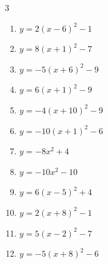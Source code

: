 \begin{multicols}{3}
\begin{enumerate}
  \item $\displaystyle y=2\left( x-6\right)^{2}-1$

        \phantom{$\displaystyle 頂点\left( 6 , -1 \right)$}

  \item $\displaystyle y=8\left( x+1\right)^{2}-7$

        \phantom{$\displaystyle 頂点\left( -1 , -7 \right)$}

  \item $\displaystyle y=-5\left( x+6\right)^{2}-9$

        \phantom{$\displaystyle 頂点\left( -6 , -9 \right)$}

  \item $\displaystyle y=6\left( x+1\right)^{2}-9$

        \phantom{$\displaystyle 頂点\left( -1 , -9 \right)$}

  \item $\displaystyle y=-4\left( x+10\right)^{2}-9$

        \phantom{$\displaystyle 頂点\left( -10 , -9 \right)$}

  \item $\displaystyle y=-10\left( x+1\right)^{2}-6$

        \phantom{$\displaystyle 頂点\left( -1 , -6 \right)$}

  \item $\displaystyle y=-8x^{2}+4$

        \phantom{$\displaystyle 頂点\left( 0 , 4 \right)$}

  \item $\displaystyle y=-10x^{2}-10$

        \phantom{$\displaystyle 頂点\left( 0 , -10 \right)$}

  \item $\displaystyle y=6\left( x-5\right)^{2}+4$

        \phantom{$\displaystyle 頂点\left( 5 , 4 \right)$}

  \item $\displaystyle y=2\left( x+8\right)^{2}-1$

        \phantom{$\displaystyle 頂点\left( -8 , -1 \right)$}

  \item $\displaystyle y=5\left( x-2\right)^{2}-7$

        \phantom{$\displaystyle 頂点\left( 2 , -7 \right)$}

  \item $\displaystyle y=-5\left( x+8\right)^{2}-6$


\end{enumerate}
\end{multicols}
